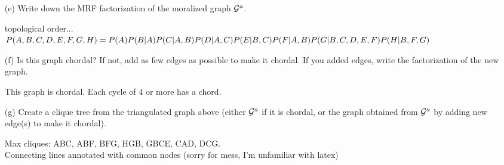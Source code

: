 \documentclass[11pt]{article}
\begin{document}
\begin{itemize}
\begin{answertext}{5cm}{}

\end{answertext}

\item[(e)] Write down the MRF factorization of the moralized graph ${\cal G}^a$.

\begin{answertext}{2cm}{}    

topological order...\\
$P(A,B,C,D,E,F,G,H) = \\
P(A)P(B|A)P(C|A,B)P(D|A,C)P(E|B,C)P(F|A,B)P(G|B,C,D,E,F)P(H|B,F,G)$

\end{answertext}

\item[(f)] Is this graph chordal?  If not, add as few edges as possible to make it chordal.  If you added edges, write the factorization of the new graph.

\begin{answertext}{1cm}{}

This graph is chordal. Each cycle of 4 or more has a chord.

\end{answertext}
\item[(g)] Create a clique tree from the triangulated graph above (either ${\cal G}^a$ if it is chordal, or the graph obtained from ${\cal G}^a$ by adding new edge(s) to make it chordal).

\begin{answertext}{8cm}{}

Max cliques: ABC, ABF, BFG, HGB, GBCE, CAD, DCG.\\

Connecting lines annotated with common nodes (sorry for mess, I'm unfamiliar with latex)

\end{answertext}
\end{itemize}
\end{document}
